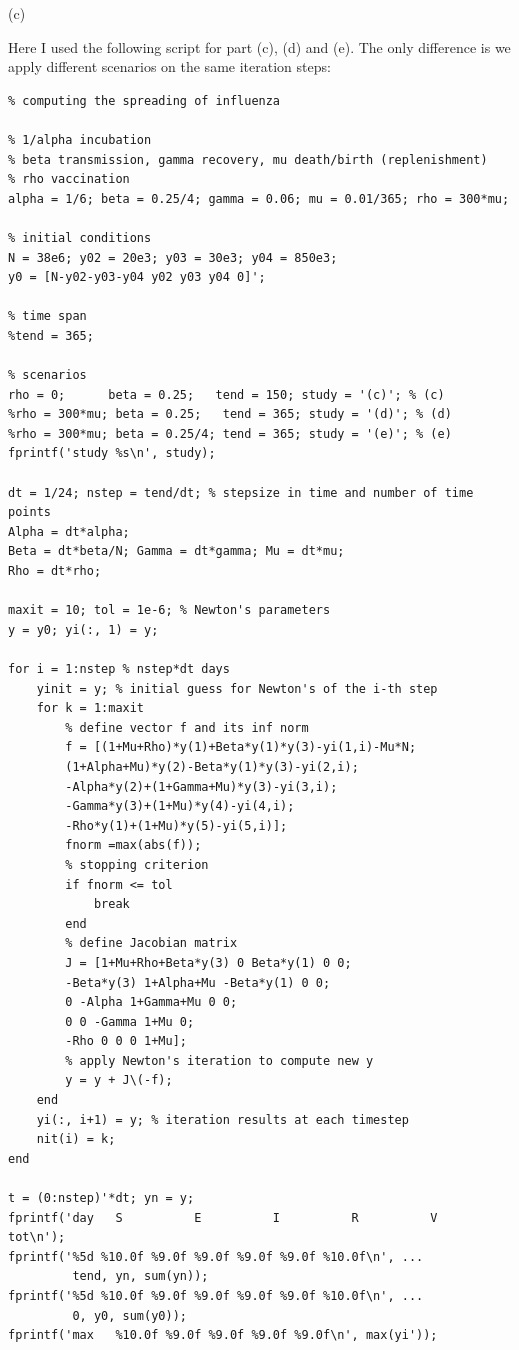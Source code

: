 \documentclass[12pt]{article}
\begin{document}
(c)

Here I used the following script for part (c), (d) and (e). The only difference is we apply different scenarios on the same iteration steps:

\begin{lstlisting}
% computing the spreading of influenza

% 1/alpha incubation
% beta transmission, gamma recovery, mu death/birth (replenishment)
% rho vaccination
alpha = 1/6; beta = 0.25/4; gamma = 0.06; mu = 0.01/365; rho = 300*mu;

% initial conditions
N = 38e6; y02 = 20e3; y03 = 30e3; y04 = 850e3;
y0 = [N-y02-y03-y04 y02 y03 y04 0]';

% time span
%tend = 365;

% scenarios
rho = 0;      beta = 0.25;   tend = 150; study = '(c)'; % (c)
%rho = 300*mu; beta = 0.25;   tend = 365; study = '(d)'; % (d)
%rho = 300*mu; beta = 0.25/4; tend = 365; study = '(e)'; % (e)
fprintf('study %s\n', study);

dt = 1/24; nstep = tend/dt; % stepsize in time and number of time points
Alpha = dt*alpha;
Beta = dt*beta/N; Gamma = dt*gamma; Mu = dt*mu;
Rho = dt*rho;

maxit = 10; tol = 1e-6; % Newton's parameters
y = y0; yi(:, 1) = y;

for i = 1:nstep % nstep*dt days
    yinit = y; % initial guess for Newton's of the i-th step
    for k = 1:maxit
        % define vector f and its inf norm
        f = [(1+Mu+Rho)*y(1)+Beta*y(1)*y(3)-yi(1,i)-Mu*N;
        (1+Alpha+Mu)*y(2)-Beta*y(1)*y(3)-yi(2,i);
        -Alpha*y(2)+(1+Gamma+Mu)*y(3)-yi(3,i);
        -Gamma*y(3)+(1+Mu)*y(4)-yi(4,i);
        -Rho*y(1)+(1+Mu)*y(5)-yi(5,i)];
        fnorm =max(abs(f));
        % stopping criterion
        if fnorm <= tol
            break
        end
        % define Jacobian matrix
        J = [1+Mu+Rho+Beta*y(3) 0 Beta*y(1) 0 0;
        -Beta*y(3) 1+Alpha+Mu -Beta*y(1) 0 0;
        0 -Alpha 1+Gamma+Mu 0 0;
        0 0 -Gamma 1+Mu 0;
        -Rho 0 0 0 1+Mu];
        % apply Newton's iteration to compute new y
        y = y + J\(-f);
    end
    yi(:, i+1) = y; % iteration results at each timestep
    nit(i) = k;
end

t = (0:nstep)'*dt; yn = y;
fprintf('day   S          E          I          R          V        tot\n');
fprintf('%5d %10.0f %9.0f %9.0f %9.0f %9.0f %10.0f\n', ...
         tend, yn, sum(yn));
fprintf('%5d %10.0f %9.0f %9.0f %9.0f %9.0f %10.0f\n', ...
         0, y0, sum(y0));
fprintf('max   %10.0f %9.0f %9.0f %9.0f %9.0f\n', max(yi'));


\end{lstlisting}
\end{document}

